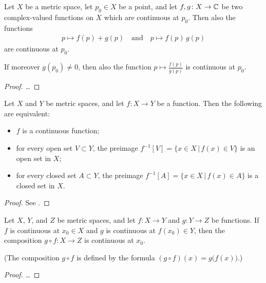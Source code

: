 \begin{lemma}
  \label{lem:complex_continuity_properties}
  Let $X$ be a metric space, let $p_0 \in X$
  be a point, and let $f,g \colon X \to \mathbb{C}$
  be two complex-valued functions on $X$
  which are continuous at $p_0$.
  Then also the functions
  \begin{align*}
    p \mapsto f(p) + g(p)
    \quad \text{and} \quad
    p \mapsto f(p) \, g(p)
  \end{align*}
  are continuous at $p_0$.

  If moreover $g(p_0) \ne 0$, then
  also the function
  $p \mapsto \frac{f(p)}{g(p)}$
  is continuous at $p_0$.
\end{lemma}
\begin{proof}
  \ldots
\end{proof}

\begin{lemma}
  \label{lem:continuity_characterization}
  Let $X$ and $Y$ be metric spaces, and let $f \colon X \to Y$ be a function.
  Then the following are equivalent:
  \begin{itemize}
    \item $f$ is a continuous function;
    \item for every open set $V \subset Y$, the preimage
      $f^{-1}[V] = \big\{ x \in X \, \big| \, f(x) \in V \big\}$
      is an open set in $X$;
    \item for every closed set $A \subset Y$, the preimage
      $f^{-1}[A] = \big\{ x \in X \, \big| \, f(x) \in A \big\}$
      is a closed set in $X$.
  \end{itemize}
\end{lemma}
\begin{proof}
  See \MetSpCourse{}.
\end{proof}

\begin{lemma}
  \label{lem:composition_continuous}
  Let $X$, $Y$, and $Z$ be metric spaces, and
  let $f \colon X \to Y$ and $g \colon Y \to Z$ be functions.
  If $f$ is continuous at $x_0 \in X$ and $g$ is continuous at $f(x_0) \in Y$,
  then the composition $g \circ f \colon X \to Z$ is continuous at $x_0$.

  (The composition $g \circ f$ is defined by
  the formula $(g \circ f)(x) = g \big( f(x) \big)$.)
\end{lemma}
\begin{proof}
  \ldots
\end{proof}

